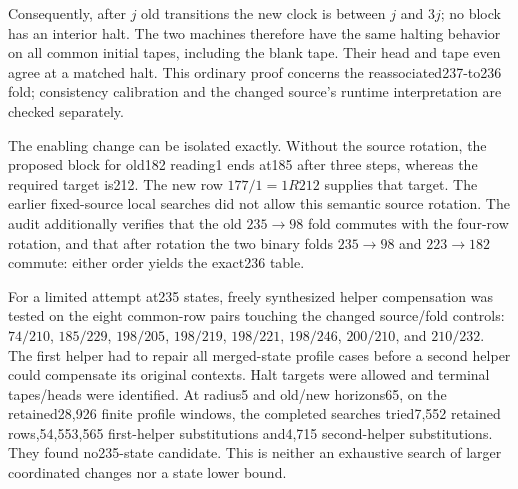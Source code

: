 Consequently, after $j$ old transitions the new clock is between $j$ and $3j$;
no block has an interior halt. The two machines therefore have the same halting
behavior on all common initial tapes, including the blank tape. Their head and
tape even agree at a matched halt. This ordinary proof concerns the
reassociated237-to236 fold; consistency calibration and the changed source's
runtime interpretation are checked separately.

The enabling change can be isolated exactly. Without the source rotation,
the proposed block for old182 reading1 ends at185 after three steps, whereas
the required target is212. The new row $177/1=1R212$ supplies that target.
The earlier fixed-source local searches did not allow this semantic source
rotation. The audit additionally verifies that the old $235\to98$ fold commutes
with the four-row rotation, and that after rotation the two binary folds
$235\to98$ and $223\to182$ commute: either order yields the exact236 table.

For a limited attempt at235 states, freely synthesized helper compensation was
tested on the eight common-row pairs touching the changed source/fold controls:
$74/210$, $185/229$, $198/205$, $198/219$, $198/221$, $198/246$, $200/210$,
and $210/232$. The first helper had to repair all merged-state profile cases
before a second helper could compensate its original contexts. Halt targets
were allowed and terminal tapes/heads were identified. At radius5 and old/new
horizons65, on the retained28,926 finite profile windows, the completed searches
tried7,552 retained rows,54,553,565 first-helper substitutions and4,715
second-helper substitutions. They found no235-state candidate. This is neither
an exhaustive search of larger coordinated changes nor a state lower bound.
